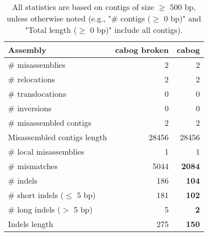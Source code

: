 \documentclass[12pt,a4paper]{article}
\begin{document}
\begin{table}[ht]
\begin{center}
\caption{All statistics are based on contigs of size $\geq$ 500 bp, unless otherwise noted (e.g., "\# contigs ($\geq$ 0 bp)" and "Total length ($\geq$ 0 bp)" include all contigs).}
\begin{tabular}{|l*{2}{|r}|}
\hline
Assembly & cabog broken & cabog \\ \hline
\# misassemblies & 2 & 2 \\ \hline
\hspace{5mm}\# relocations & 2 & 2 \\ \hline
\hspace{5mm}\# translocations & 0 & 0 \\ \hline
\hspace{5mm}\# inversions & 0 & 0 \\ \hline
\# misassembled contigs & 2 & 2 \\ \hline
Misassembled contigs length & 28456 & 28456 \\ \hline
\# local misassemblies & 1 & 1 \\ \hline
\# mismatches & 5044 & {\bf 2084} \\ \hline
\# indels & 186 & {\bf 104} \\ \hline
\hspace{5mm}\# short indels ($\leq$ 5 bp) & 181 & {\bf 102} \\ \hline
\hspace{5mm}\# long indels ($>$ 5 bp) & 5 & {\bf 2} \\ \hline
Indels length & 275 & {\bf 150} \\ \hline
\end{tabular}
\end{center}
\end{table}
\end{document}
